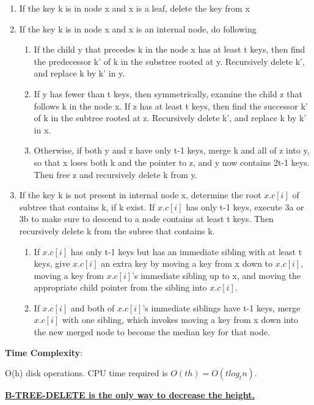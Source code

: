     \begin{enumerate}
        \item If the key k is in node x and x is a leaf, delete the key from x
        \item If the key k is in node x and x is an internal node, do following
        \begin{enumerate}[label=(\alph*)]
            \item If the child y that precedes k in the node x has at least t keys,
            then find the predecessor k' of k in the substree rooted at y. Recursively 
            delete k', and replace k by k' in y.
            \item If y has fewer than t keys, then symmetrically, examine the child 
            z that follows k in the node x. If z has at least t keys, then find the 
            successor k' of k in the subtree rooted at z. Recursively delete k', and 
            replace k by k' in x.
            \item Otherwise, if both y and z have only t-1 keys, merge k and all 
            of z into y, so that x loses both k and the pointer to z, and y now 
            contains 2t-1 keys. Then free z and recursively delete k from y.
        \end{enumerate}
        \item If the key k is not present in internal node x, determine the root 
        $x.c[i]$ of subtree that contains k, if k exist. If $x.c[i]$ has only t-1 
        keys, execute 3a or 3b to make sure to descend to a node contains at least 
        t keys. Then recursively delete k from the subree that contains k.
        \begin{enumerate}[label=(\alph*)]
            \item If $x.c[i]$ has only t-1 keys but has an immediate sibling with at 
            least t keys, give $x.c[i]$ an extra key by moving a key from x down to 
            $x.c[i]$, moving a key from $x.c[i]$'s immediate sibling up to x, and 
            moving the appropriate child pointer from the sibling into $x.c[i]$.
            \item If $x.c[i]$ and both of $x.c[i]$'s immediate siblings have t-1
            keys, merge $x.c[i]$ with one sibling, which invokes moving a key from
            x down into the new merged node to become the median key for that node.
        \end{enumerate}
    \end{enumerate}
    
    \textbf{Time Complexity}:

    O(h) disk operations. CPU time required is $O(th)=O(tlog_t n)$.

    \underline{\textbf{B-TREE-DELETE is the only way to decrease the height.}}

